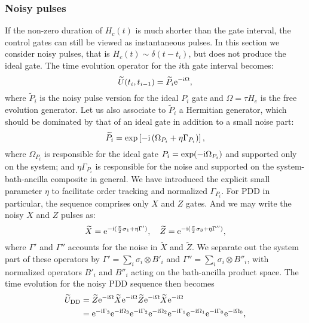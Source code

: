 \documentclass[pra,reprint,superscriptaddress]{revtex4-2}
\newcommand{\wt}[1]{\widetilde{#1}}
\newcommand{\rDD}{\mathrm{DD}}
\begin{document}
\subsubsection{Noisy pulses}
If the non-zero duration of $H_c(t)$ is much shorter than the gate interval,  the control gates can still be viewed as instantaneous pulses. In this section we consider noisy pulses, that is 
$H_c(t)\sim \delta(t-t_i)$, but does not produce the ideal gate.
The  time evolution operator for the $i$th gate interval becomes:
\begin{equation}\label{eq:npulses-Ui}
 \wt{U}(t_i,t_{i-1}) = \wt{P}_i \upe^{-\upi \Omega},
\end{equation}
where $\widetilde{P}_i$ is the noisy pulse version for the ideal $P_i$ gate and $\Omega=\tau H_e$ is the free evolution generator.
Let us also associate to $\wt{P}_i$ a Hermitian generator, which should be dominated by that of an ideal gate in addition to a small noise part:
\begin{equation}\label{eq:npulses-Pi}
 \widetilde{P}_i= \exp\left[ -\mathrm{i} \left( \Omega_{P_i} +  \eta \Gamma_{P_i} \right)  \right],
\end{equation}
where $\Omega_{P_i}$ is responsible for the ideal gate $P_i = \exp(-\mathrm{i} \Omega_{P_i})$ and supported only on the system; and $ \eta \Gamma_{P_i} $ is responsible for the noise and supported on the system-bath-ancilla composite in general. We have introduced the explicit small parameter $\eta$ to facilitate order tracking and normalized $\Gamma_{P_i}$. For PDD in particular, the sequence comprises only $X$ and $Z$ gates. 
And we may write the noisy $X$ and $Z$ pulses as:
\begin{equation}
\widetilde{X} = \mathrm{e}^{-\mathrm{i} ( \frac{\pi}{2} \sigma_1 + \eta\Gamma')},\quad
 \widetilde{Z} = \mathrm{e}^{-\mathrm{i} ( \frac{\pi}{2} \sigma_3 + \eta\Gamma'')},
\end{equation}
where $\Gamma'$ and $\Gamma''$ accounts for the noise in $\wt X$ and $\wt Z$.
We separate out the system part of these operators by $\Gamma' = \sum_i \sigma_i \otimes B'_i $ and $\Gamma''=\sum_i \sigma_i \otimes B''_i$, with normalized operators $B'_i$ and $B''_i$ acting on the bath-ancilla product space. 
The time evolution for the noisy PDD sequence then becomes
\begin{equation}\label{eq:UPDD-gatedep}
 \begin{aligned}
\wt{U}_\rDD &=
 \widetilde{Z} \upe^{-\upi \Omega}
 \widetilde{X} \upe^{-\upi \Omega}
 \widetilde{Z} \upe^{-\upi \Omega}
 \widetilde{X} \upe^{-\upi \Omega}\\
 & = \upe^{-\upi  \Gamma_3} \upe^{- \upi\Omega_3}
 \upe^{-\upi  \Gamma_2}  \upe^{-\upi\Omega_2}
\upe^{-\upi  \Gamma_1} \upe^{-\upi\Omega_1}
\upe^{-\upi  \Gamma_0}  \upe^{-\upi \Omega_0},
\end{aligned}
\end{equation}
\end{document}
